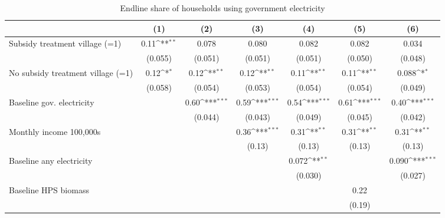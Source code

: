 \begin{table}[htbp]\centering
\def\sym#1{\ifmmode^{#1}\else\(^{#1}\)\fi}
\caption{Endline share of households using government electricity}
\begin{tabular*}{1\hsize}{@{\hskip\tabcolsep\extracolsep\fill}l*{6}{c}}
\toprule
                &\multicolumn{1}{c}{(1)}         &\multicolumn{1}{c}{(2)}         &\multicolumn{1}{c}{(3)}         &\multicolumn{1}{c}{(4)}         &\multicolumn{1}{c}{(5)}         &\multicolumn{1}{c}{(6)}         \\
\midrule
Subsidy treatment village (=1)&     0.11\sym{**} &    0.078         &    0.080         &    0.082         &    0.082         &    0.034         \\
                &  (0.055)         &  (0.051)         &  (0.051)         &  (0.051)         &  (0.050)         &  (0.048)         \\
No subsidy treatment village (=1)&     0.12\sym{*}  &     0.12\sym{**} &     0.12\sym{**} &     0.11\sym{**} &     0.11\sym{**} &    0.088\sym{*}  \\
                &  (0.058)         &  (0.054)         &  (0.053)         &  (0.054)         &  (0.054)         &  (0.049)         \\
Baseline gov. electricity&                  &     0.60\sym{***}&     0.59\sym{***}&     0.54\sym{***}&     0.61\sym{***}&     0.40\sym{***}\\
                &                  &  (0.044)         &  (0.043)         &  (0.049)         &  (0.045)         &  (0.042)         \\
Monthly income 100,000s&                  &                  &     0.36\sym{***}&     0.31\sym{**} &     0.31\sym{**} &     0.31\sym{**} \\
                &                  &                  &   (0.13)         &   (0.13)         &   (0.13)         &   (0.13)         \\
Baseline any electricity&                  &                  &                  &    0.072\sym{**} &                  &    0.090\sym{***}\\
                &                  &                  &                  &  (0.030)         &                  &  (0.027)         \\
Baseline HPS biomass&                  &                  &                  &                  &     0.22         &                  \\
                &                  &                  &                  &                  &   (0.19)         &                  \\

\end{tabular*}
\end{table}
